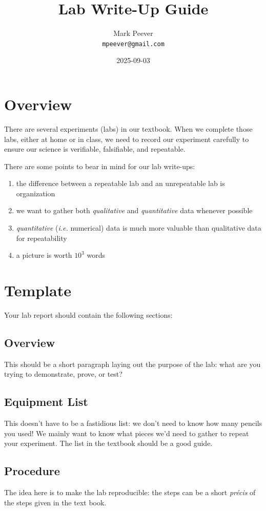 \documentclass[12pt, oneside]{article}   	%
\title{Lab Write-Up Guide}
\author{Mark Peever\\ \texttt{mpeever@gmail.com}}
\date{2025-09-03}
\begin{document}
\maketitle

\section{Overview}
There are several experiments (labs) in our textbook. When we complete those labs, either at home or in class, we need to record our experiment carefully to ensure our science is verifiable, falsifiable, and repeatable. 

There are some points to bear in mind for our lab write-ups:
\begin{enumerate}
\item the difference between a repeatable lab and an unrepeatable lab is organization
\item we want to gather both \emph{qualitative} and \emph{quantitative} data whenever possible
\item \emph{quantitative} (\emph{i.e.} numerical) data is much more valuable than qualitative data for repeatability
\item a picture is worth $10^{3}$ words
\end{enumerate}

\section{Template}
Your lab report should contain the following sections:

\subsection{Overview}
This should be a short paragraph laying out the purpose of the lab: what are you trying to demonstrate, prove, or test?

\subsection{Equipment List}
This doesn't have to be a fastidious list: we don't need to know how many pencils you used! We mainly want to know what pieces we'd need to gather to repeat your experiment. The list in the textbook should be a good guide.

\subsection{Procedure}
The idea here is to make the lab reproducible: the steps can be a short \emph{pr\'{e}cis} of the steps given in the text book.
\end{document}
